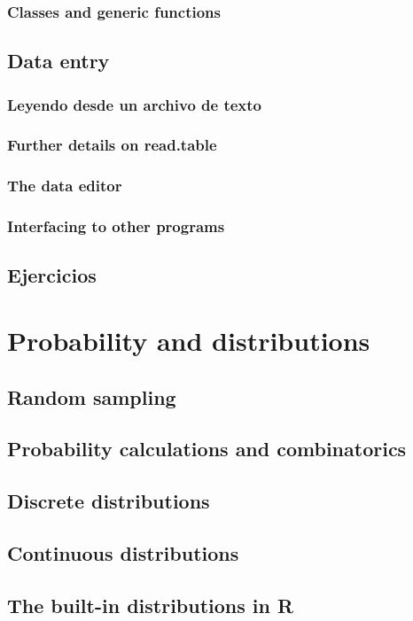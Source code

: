 \documentclass[spanish]{extbook}
\numberwithin{equation}{section}
\numberwithin{figure}{section}
\begin{document}
\subsection{Classes and generic functions}

\section{Data entry}
\subsection{Leyendo desde un archivo de texto} \label{readtextfile}
\subsection{Further details on read.table}
\subsection{The data editor}
\subsection{Interfacing to other programs}
\section{Ejercicios}

\chapter{Probability and distributions}
\section{Random sampling}
\section{Probability calculations and combinatorics}
\section{Discrete distributions}
\section{Continuous distributions}
\section{The built-in distributions in R}
\end{document}

